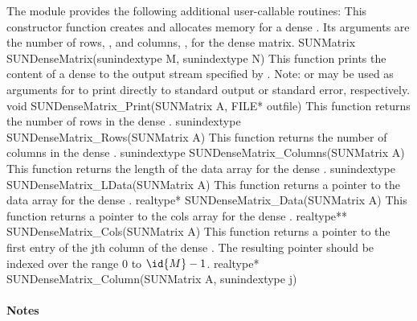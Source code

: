 The module {\sunmatdense} provides the following additional
user-callable routines: 
{
  This constructor function creates and allocates memory for a dense .
  Its arguments are the number of rows, , and columns, , for
  the dense matrix.
}
{
  SUNMatrix SUNDenseMatrix(sunindextype M, sunindextype N)
}
{
  This function prints the content of a dense  to the
  output stream specified by .  Note: 
  or  may be used as arguments for  to print
  directly to standard output or standard error, respectively.
}
{
  void SUNDenseMatrix\_Print(SUNMatrix A, FILE* outfile)
}
{
  This function returns the number of rows in the dense .
}
{
  sunindextype SUNDenseMatrix\_Rows(SUNMatrix A)
}
{
  This function returns the number of columns in the dense .
}
{
  sunindextype SUNDenseMatrix\_Columns(SUNMatrix A)
}
{
  This function returns the length of the data array for the dense .
}
{
  sunindextype SUNDenseMatrix\_LData(SUNMatrix A)
}
{
  This function returns a pointer to the data array for the dense .
}
{
  realtype* SUNDenseMatrix\_Data(SUNMatrix A)
}
{
  This function returns a pointer to the cols array for the dense .
}
{
  realtype** SUNDenseMatrix\_Cols(SUNMatrix A)
}
{
  This function returns a pointer to the first entry of the jth
  column of the dense .  The resulting pointer should
  be indexed over the range $0$ to $\id{M}-1$.
}
{
  realtype* SUNDenseMatrix\_Column(SUNMatrix A, sunindextype j)
}
\paragraph{\bf Notes}                                                      
           
